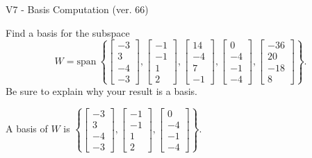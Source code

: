 \begin{exercise}
  \begin{exerciseTitle}V7 - Basis Computation (ver. 66)\end{exerciseTitle}
  \begin{exerciseStatement}
    Find a basis for the subspace 
\[W=\mathrm{span}\ \left\{\left[\begin{array}{r}
-3 \\
3 \\
-4 \\
-3
\end{array}\right] , \left[\begin{array}{r}
-1 \\
-1 \\
1 \\
2
\end{array}\right] , \left[\begin{array}{r}
14 \\
-4 \\
7 \\
-1
\end{array}\right] , \left[\begin{array}{r}
0 \\
-4 \\
-1 \\
-4
\end{array}\right] , \left[\begin{array}{r}
-36 \\
20 \\
-18 \\
8
\end{array}\right]\right\}.\]
 Be sure to explain why your result is a basis.


  \end{exerciseStatement}
  \begin{exerciseAnswer}
   A basis of \(W\) is  \(\left\{\left[\begin{array}{r}
-3 \\
3 \\
-4 \\
-3
\end{array}\right] , \left[\begin{array}{r}
-1 \\
-1 \\
1 \\
2
\end{array}\right] , \left[\begin{array}{r}
0 \\
-4 \\
-1 \\
-4
\end{array}\right]\right\}\).
  


  \end{exerciseAnswer}
\end{exercise}